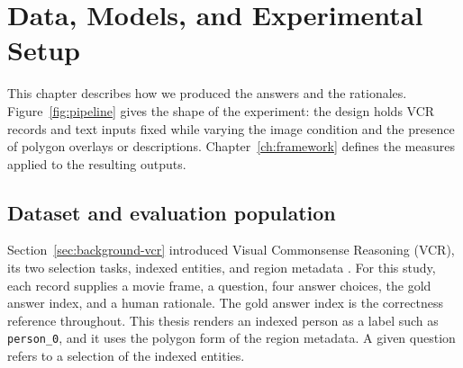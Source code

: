 
\chapter{Data, Models, and Experimental Setup}
\label{ch:setup}

This chapter describes how we produced the answers and the rationales.
Figure~\ref{fig:pipeline} gives the shape of the experiment: the design holds
VCR records and text inputs fixed while varying the image condition and the
presence of polygon overlays or descriptions. Chapter~\ref{ch:framework} defines
the measures applied to the resulting outputs.



\section{Dataset and evaluation population}
\label{sec:setup-dataset}

Section~\ref{sec:background-vcr} introduced Visual Commonsense Reasoning (VCR),
its two selection tasks, indexed entities, and region metadata
\citep{DBLP:conf/cvpr/ZellersBFC19}. For this study, each record supplies a movie
frame, a question, four answer choices, the gold answer index, and a human
rationale. The gold answer index is the correctness reference throughout. This
thesis renders an indexed person as a label such as \texttt{person\_0}, and it
uses the polygon form of the region metadata. A given question refers to a
selection of the indexed entities.

